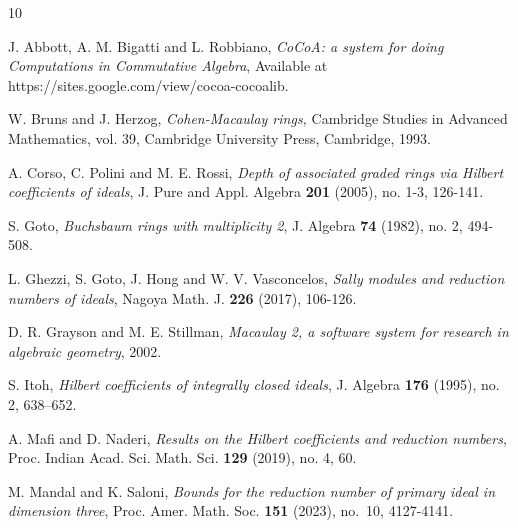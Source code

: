 \documentclass[11pt]{amsart}
\theoremstyle{plain}
\theoremstyle{plain}
\begin{document}
\providecommand{\bysame}{\leavevmode\hbox to3em{\hrulefill}\thinspace}
\providecommand{\MR}{\relax\ifhmode\unskip\space\fi MR }
\providecommand{\MRhref}[2]{
  \href{http://www.ams.org/mathscinet-getitem?mr=#1}{#2}
}
\begin{thebibliography}{10}


J. Abbott, A. M. Bigatti and L. Robbiano, \emph{CoCoA: a system for doing Computations in Commutative Algebra}, Available at https://sites.google.com/view/cocoa-cocoalib.

W. Bruns and J. Herzog, \emph{Cohen-Macaulay rings,} Cambridge Studies in Advanced Mathematics, vol. 39, Cambridge University Press, Cambridge, 1993.

A. Corso, C. Polini and M. E. Rossi, \emph{Depth of associated graded rings via Hilbert coefficients of ideals}, J. Pure and Appl. Algebra \textbf{201} (2005), no. 1-3, 126-141.

S. Goto, \emph{Buchsbaum rings with multiplicity 2}, J. Algebra \textbf{74} (1982), no. 2, 494-508.


L. Ghezzi, S. Goto, J. Hong and W. V. Vasconcelos, \emph{Sally modules and reduction numbers of ideals}, Nagoya Math. J. \textbf{226} (2017), 106-126.



D. R. Grayson and M. E. Stillman, \emph{Macaulay 2, a software system for research in algebraic geometry}, 2002.


S. Itoh, \emph{Hilbert coefficients of integrally closed ideals}, J. Algebra \textbf{176} (1995), no. 2, 638–652.

A. Mafi and D. Naderi, \emph{Results on the Hilbert coefficients and reduction numbers}, Proc. Indian Acad. Sci. Math. Sci.
\textbf{129} (2019), no. 4, 60.

 M. Mandal and K. Saloni, \textit{Bounds for the reduction number of primary ideal in dimension three}, Proc. Amer. Math. Soc. {\bf 151} (2023), no.~10, 4127-4141.


\end{thebibliography}
\end{document}
